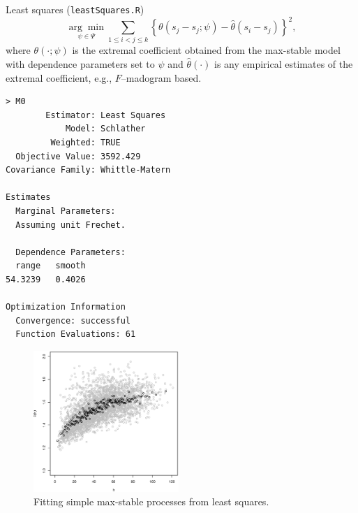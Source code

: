 \documentclass[mode=present,style=simple,paper=screen]{powerdot}
\theoremstyle{plain}%
\theoremstyle{definition}
\theoremstyle{remark}
\begin{document}
\begin{wideslide}[toc=Least squares,method=file]{Least squares
    (\texttt{leastSquares.R}) \citep{Smith1990}}
  \vspace*{-0.5em}
  \begin{equation*}
    \underset{\psi \in \Psi}{\arg \min} \sum_{1 \leq i < j \leq k}
    \left\{\theta(s_j - s_j; \psi) - \hat \theta(s_i - s_j)
    \right\}^2,
  \end{equation*}
  where $\theta(\cdot; \psi)$ is the extremal coefficient obtained
  from the max-stable model with dependence parameters set to $\psi$
  and $\hat \theta(\cdot)$ is any empirical estimates of the extremal
  coefficient, e.g., $F$--madogram based.

  \begin{minipage}[l]{.33\linewidth}
{\tiny
\begin{verbatim}
> M0
        Estimator: Least Squares
            Model: Schlather
         Weighted: TRUE
  Objective Value: 3592.429
Covariance Family: Whittle-Matern

Estimates
  Marginal Parameters:
  Assuming unit Frechet.

  Dependence Parameters:
  range   smooth
54.3239   0.4026

Optimization Information
  Convergence: successful
  Function Evaluations: 61
\end{verbatim}
}
  \end{minipage}
  \hfill
  \begin{minipage}[r]{.6\linewidth}
    \begin{figure}
      \centering
      \includegraphics[width=0.49\textwidth]{Figures/empExtCoeffRain}%
      \caption{Fitting simple max-stable processes from least
        squares.}
      \label{fig:leastSquares}
    \end{figure}
  \end{minipage}
\end{wideslide}
\end{document}
